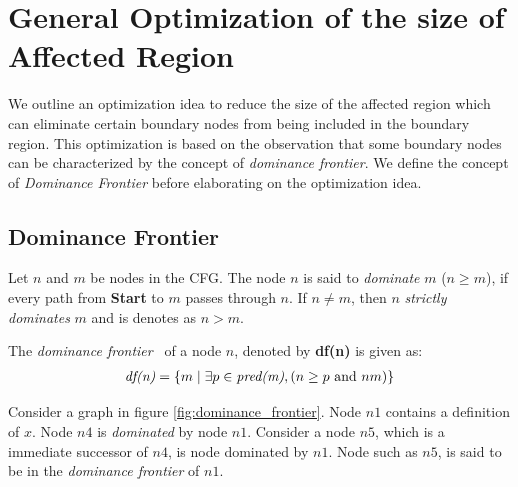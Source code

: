 \documentclass[11pt,a4paper,openright]{report}
\begin{document}
\section{General Optimization of the size of Affected Region}
We outline an optimization idea to reduce the size of the affected region which can 
eliminate certain boundary nodes from being included in the boundary region.
This optimization is based on the observation that some boundary nodes can be characterized
by the concept of \emph{dominance frontier}. We define the concept of \textit{Dominance Frontier} before elaborating on the optimization idea.

\subsection*{Dominance Frontier}

Let $n$ and $m$ be nodes in the CFG. The node $n$ is said to \textit{dominate} $m$ ($n\geq m$), if every path from \textbf{Start} to $m$ passes through $n$.
If $n \neq m$, then $n$ \textit{strictly dominates} $m$ and is denotes as $n > m$.  

The \textit{dominance frontier}~\cite{book} of a node $n$, denoted by \textbf{df(n)} is given as:
\begin{equation}
\begin{split}
\mbox{\textit{df(n)}} &= \{ m \mid \exists p \in \textit{pred(m)}, ( n \geq p \mbox{ and } n  m )\} \\	  
\end{split} 
\end{equation}

Consider a graph in figure \ref{fig:dominance_frontier}. Node $n1$ contains a definition of $x$. Node $n4$ is \textit{dominated} by node $n1$. Consider a node $n5$, which is a 
immediate successor of $n4$, is node dominated by $n1$. Node such as $n5$, is said to be in the \textit{dominance frontier} of $n1$. 
\end{document}

